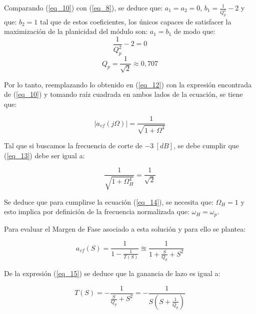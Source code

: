 \documentclass[12pt,a4paper]{article}
\begin{document}
    
    Comparando (\ref{eq_10}) con (\ref{eq_8}), se deduce que: $a_1=a_2=0$, $b_1=\frac{1}{Q_p^2}-2$ y que: $b_2=1$ tal que de estos coeficientes, los únicos capaces de satisfacer la maximización de la planicidad del módulo son: $a_1=b_1$ de modo que: 
    \begin{equation}
        \label{eq_11}
        \frac{1}{Q_p^2}-2=0
    \end{equation}
    \begin{equation}
        \label{eq_12}
        Q_p = \frac{1}{\sqrt{2}} \approx 0,707
    \end{equation}
\hspace{0.5 cm}

Por lo tanto, reemplazando lo obtenido en (\ref{eq_12}) con la expresión encontrada de (\ref{eq_10}) y tomando raíz cuadrada en ambos lados de la ecuación, se tiene que:

     \begin{equation}
         \label{eq_13}
         |a_{vf}(j\Omega)| = \frac{1}{\sqrt{1 + \Omega^4}}
     \end{equation}
     \hspace{0.5 cm}

     
    Tal que si buscamos la frecuencia de corte de $-3~[dB]$, se debe cumplir que (\ref{eq_13}) debe ser igual a:
    
    \begin{equation}
        \label{eq_14}
        \frac{1}{\sqrt{1 + \Omega_H^4}} = \frac{1}{\sqrt{2}}
    \end{equation}
    \hspace{0.5 cm}

    
    Se deduce que para cumplirse la ecuación (\ref{eq_14}), se necesita que: $\Omega_H = 1$ y esto implica por definición de la frecuencia normalizada que: $\omega_H = \omega_p$.

 Para evaluar el Margen de Fase asociado a esta solución y para ello se plantea:
 
    \begin{equation}
        \label{eq_15}
        a_{vf}(S) = \frac{1}{1 - \frac{1}{T(S)}} \approxeq \frac{1}{1 + \frac{S}{Q_p} + S^2}
    \end{equation}
    \hspace{0.5 cm}

    
    De la expresión (\ref{eq_15}) se deduce que la ganancia de lazo es igual a:
    
    \begin{equation}
        \label{eq_16}
        T(S) = -\frac{1}{\frac{S}{Q_p} + S^2} = -\frac{1}{S(S + \frac{1}{Q_p})}
    \end{equation}
    \hspace{0.5 cm}
\end{document}
